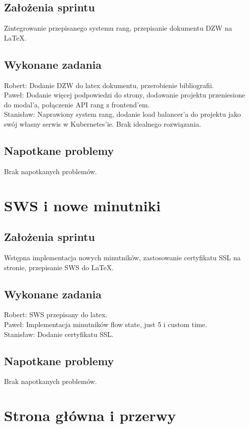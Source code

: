 \documentclass[a4paper,11pt]{report}
\begin{document}
\subsection {Założenia sprintu}
Zintegrowanie przepisanego systemu rang, przepisanie dokumentu DZW na LaTeX.
\subsection {Wykonane zadania}
Robert: Dodanie DZW do latex dokumentu, przerobienie bibliografii.\\ 
Paweł: Dodanie więcej podpowiedzi do strony, dodawanie projektu przeniesione do modal'a, połączenie API rang z frontend'em.\\
Stanisław: Naprawiony system rang, dodanie load balancer'a do projektu jako swój własny serwis w Kubernetes'ie. Brak idealnego rozwiązania. \\
\subsection {Napotkane problemy}
Brak napotkanych problemów.

\section {SWS i nowe minutniki}
\label{sec:zarzadzanie_czasomierzem}
\subsection {Założenia sprintu}
Wstępna implementacja nowych minutników, zastosowanie certyfikatu SSL na stronie, przepisanie SWS do LaTeX.
\subsection {Wykonane zadania}
Robert: SWS przepisany do latex.\\
Paweł: Implementacja minutników flow state, just 5 i custom time. \\ 
Stanisław: Dodanie certyfikatu SSL.  \\
\subsection {Napotkane problemy}
Brak napotkanych problemów.

\section {Strona główna i przerwy}
\end{document}

